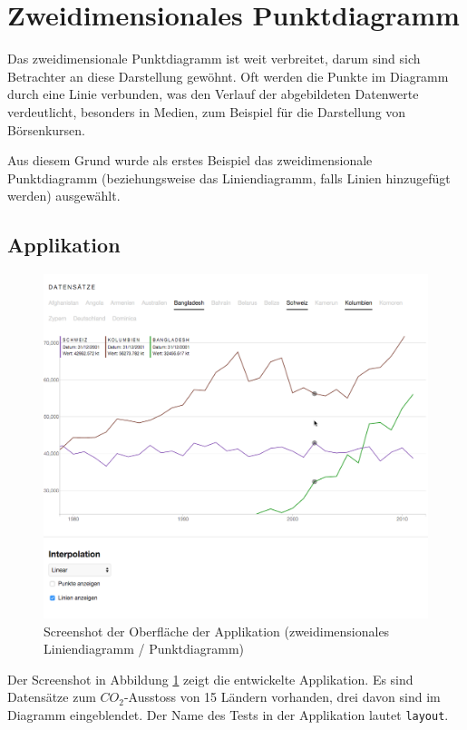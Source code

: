 \section{Zweidimensionales Punktdiagramm}

Das zweidimensionale Punktdiagramm ist weit verbreitet, darum sind sich Betrachter an diese Darstellung gewöhnt. Oft werden die Punkte im Diagramm durch eine Linie verbunden, was den Verlauf der abgebildeten Datenwerte verdeutlicht, besonders in Medien, zum Beispiel für die Darstellung von Börsenkursen. 

Aus diesem Grund wurde als erstes Beispiel das zweidimensionale Punktdiagramm (beziehungsweise das Liniendiagramm, falls Linien hinzugefügt werden) ausgewählt.


\subsection{Applikation}

\begin{figure}[!htbp]
	\centering
	\includegraphics[width=\linewidth]{images/2dline}
	\caption{Screenshot der Oberfläche der Applikation (zweidimensionales Liniendiagramm / Punktdiagramm)}
	\label{fig:screenshot}
\end{figure}

Der Screenshot in Abbildung \ref{fig:screenshot} zeigt die entwickelte Applikation. Es sind Datensätze \cite{worldbank} zum $CO_2$-Ausstoss von 15 Ländern vorhanden, drei davon sind im Diagramm eingeblendet. Der Name des Tests in der Applikation lautet \texttt{layout}.

